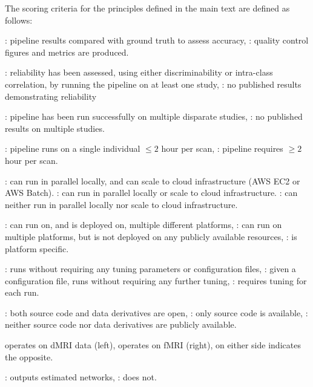 \documentclass[11pt]{article}
\begin{document}
The scoring criteria for the principles defined in the main text are defined as follows:
\begin{description}[style=unboxed,leftmargin=0cm]
        \item[Accurate] \greencheck: pipeline results compared with ground truth to assess accuracy, \ocheck: quality control figures and metrics are produced.
        \item[Reliable] \greencheck: reliability has been assessed, using either discriminability or intra-class correlation, by running the pipeline on at least one study, \ocheck: no published results demonstrating reliability
        \item[Robust] \greencheck: pipeline has been run successfully on multiple disparate studies,  \ocheck: no published results on multiple studies.
        \item[Expedient] \greencheck: pipeline runs on a single individual $\leq 2$ hour per scan, \redx: pipeline requires $\geq 2$ hour per scan.
        \item[Parallelized] \greencheck: can run in parallel locally, and can scale to cloud infrastructure (AWS EC2 or AWS Batch). \ocheck: can run in parallel locally or scale to cloud infrastructure. \redx: can neither run in parallel locally nor scale to cloud infrastructure.
        \item[Portable] \greencheck: can run on, and is deployed on, multiple different platforms, \ocheck:  can run on multiple platforms, but is not deployed on any publicly available resources, \redx:  is platform specific.
        \item[Turn-Key] \greencheck: runs without requiring any tuning parameters or configuration files, \ocheck:  given a configuration file, runs without requiring any further tuning, \redx: requires tuning for each run.
        \item[Open] \greencheck: both source code and data derivatives are open, \ocheck: only source code is available, \redx: neither source code nor data derivatives are publicly available.
        \item[dMRI\& fMRI] \greencheck operates on dMRI data (left), operates on  fMRI (right), \redx on either side indicates the opposite.
        \item[Raw-to-Graph] \greencheck: outputs estimated networks, \redx: does not.
\end{description}
\end{document}
